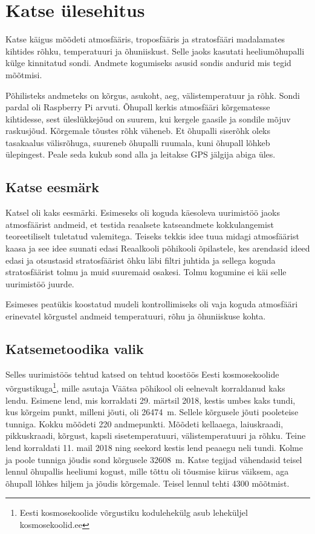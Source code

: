 \documentclass{trkut}%
\begin{document}
\chapter{Katse ülesehitus}
Katse käigus mõõdeti atmosfääris, troposfääris ja stratosfääri madalamates kihtides rõhku, temperatuuri ja õhuniiskust. Selle jaoks kasutati heeliumõhupalli külge kinnitatud sondi. Andmete kogumiseks asusid sondis andurid mis tegid mõõtmisi.

Põhilisteks andmeteks on kõrgus, asukoht, aeg, välistemperatuur ja rõhk. Sondi pardal oli Raspberry Pi arvuti. Õhupall kerkis atmosfääri kõrgematesse kihtidesse, sest üleslükkejõud on suurem, kui kergele gaasile ja sondile mõjuv raskusjõud. Kõrgemale tõustes rõhk väheneb. Et õhupalli siserõhk oleks tasakaalus välisrõhuga, suureneb õhupalli ruumala, kuni õhupall lõhkeb ülepingest. Peale seda kukub sond alla ja leitakse GPS jälgija abiga üles.


\section{Katse eesmärk}
Katsel oli kaks eesmärki. Esimeseks oli koguda käesoleva uurimistöö jaoks atmosfäärist andmeid, et testida reaalsete katseandmete kokkulangemist teoreetiliselt tuletatud valemitega. Teiseks tekkis idee tuua midagi atmosfäärist kaasa ja see idee suunati edasi Reaalkooli põhikooli õpilastele, kes arendasid ideed edasi ja otsustasid stratosfäärist õhku läbi filtri juhtida ja sellega koguda stratosfäärist tolmu ja muid suuremaid osakesi. Tolmu kogumine ei käi selle uurimistöö juurde.

Esimeses peatükis koostatud mudeli kontrollimiseks oli vaja koguda atmosfääri erinevatel kõrgustel andmeid temperatuuri, rõhu ja õhuniiskuse kohta.

\section{Katsemetoodika valik}
Selles uurimistöös tehtud katsed on tehtud koostöös Eesti kosmosekoolide võrgustikuga\footnote{Eesti kosmosekoolide võrgustiku kodulehekülg asub leheküljel kosmosekoolid.ee}, mille asutaja Väätsa põhikool oli eelnevalt korraldanud kaks lendu. Esimene lend, mis korraldati 29. märtsil 2018, kestis umbes kaks tundi, kus kõrgeim punkt, milleni jõuti, oli \SI{26474}{m}. Sellele kõrgusele jõuti pooleteise tunniga. Kokku mõõdeti 220 andmepunkti. Mõõdeti kellaaega, laiuskraadi, pikkuskraadi, kõrgust, kapsli sisetemperatuuri, välistemperatuuri ja rõhku. Teine lend korraldati 11. mail 2018 ning seekord kestis lend peaaegu neli tundi. Kolme ja poole tunniga jõudis sond kõrgusele \SI{32608}{m}. Katse tegijad vähendasid teisel lennul õhupallis heeliumi kogust, mille tõttu oli tõusmise kiirus väiksem, aga õhupall lõhkes hiljem ja jõudis kõrgemale. Teisel lennul tehti 4300 mõõtmist.
\end{document}
